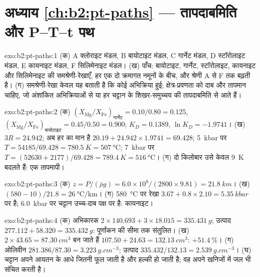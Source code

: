 \section*{अध्याय \ref{ch:b2:pt-paths} --- तापदाबमिति और P--T--t पथ}

\begin{solution}{exo:b2:pt-paths:1}
(क) A क्लोराइट मंडल, B बायोटाइट मंडल, C गार्नेट मंडल, D स्टॉरोलाइट मंडल, E कायनाइट मंडल,
F सिलिमेनाइट मंडल। (ख) पाँच: बायोटाइट, गार्नेट, स्टॉरोलाइट, कायनाइट और सिलिमेनाइट की
समश्रेणी-रेखाएँ, हर एक दो क्रमागत नमूनों के बीच, और श्रेणी A से F तक बढ़ती है। (ग) समश्रेणी-रेखा
केवल यह बताती है कि कोई अभिक्रिया हुई; क्षेत्र-प्रवणता को दाब और तापमान चाहिए, जो
अंशांकित अभिक्रियाओं से या हर चट्टान के शिखर-समुच्चय की तापदाबमिति से
आते हैं।
\end{solution}

\begin{solution}{exo:b2:pt-paths:2}
(क) $(X_{\text{Mg}}/X_{\text{Fe}})_{\text{गार्नेट}} = 0.10/0.80 = 0.125$,
$(X_{\text{Mg}}/X_{\text{Fe}})_{\text{बायोटाइट}} = 0.45/0.50 = 0.900$; $K_D = 0.1389$, $\ln K_D =
-1.9741$। (ख) $3R = 24.942$; अब हर का मान है $20.19 + 24.942\times1.9741 = 69.428$;
\qty{5}{kbar} पर $T = 54185/69.428 = \qty{780.5}{K} = \qty{507}{\celsius}$;
\qty{7}{kbar} पर $T = (52630 + 2177)/69.428 = \qty{789.4}{K} = \qty{516}{\celsius}$।
(ग) दो किलोबार उसे केवल \qty{9}{K} बदलते हैं: एक तापमापी।
\end{solution}

\begin{solution}{exo:b2:pt-paths:3}
(क) $z = P/(\bar\rho g) = 6.0\times10^8/(2800\times9.81) = \qty{21.8}{km}$।
(ख) $(580 - 10)/21.8 = \qty{26}{\celsius\per\km}$। (ग) \qty{580}{\celsius} पर रेखा
$3.67 + 0.8\times2.10 = \qty{5.35}{kbar}$ पर है; \qty{6.0}{kbar} पर चट्टान
उच्च-दाब पक्ष पर है: कायनाइट।
\end{solution}

\begin{solution}{exo:b2:pt-paths:4}
(क) अभिकारक $2\times140.693 + 3\times18.015 = \qty{335.431}{g}$; उत्पाद $277.112 +
58.320 = \qty{335.432}{g}$: पूर्णांकन की सीमा तक संतुलित। (ख) $2\times43.65 =
\qty{87.30}{cm^3}$ बन जाते हैं $107.50 + 24.63 = \qty{132.13}{cm^3}$: $+\qty{51.4}{\percent}$।
(ग) ओलिवीन $281.386/87.30 = \qty{3.223}{g.cm^{-3}}$; उत्पाद $335.432/132.13 =
\qty{2.539}{g.cm^{-3}}$। (घ) चट्टान अपने आयतन के आधे जितनी फूल जाती है और हल्की हो जाती है; वह
अपने खनिजों में जल भी संचित करती है।
\end{solution}

